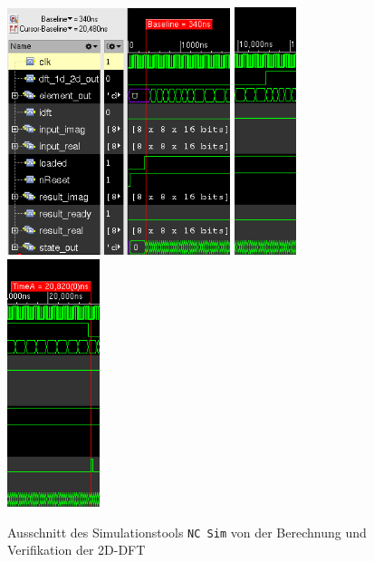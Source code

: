  \begin{figure}[htbp]
  \centering
  \includegraphics[width=0.58\textwidth]{img/Simulationsdauer_Anfang.png}
  \hfill
  \includegraphics[width=0.161\textwidth]{img/Simulationsdauer_Mitte.png}
  \hfill
  \includegraphics[width=0.241\textwidth]{img/Simulationsdauer_Ende.png}
  \caption{Ausschnitt des Simulationstools \texttt{NC\,Sim} von der Berechnung und Verifikation der 2D-DFT}
  \label{pic:Simulationsdauer}
 \end{figure}

